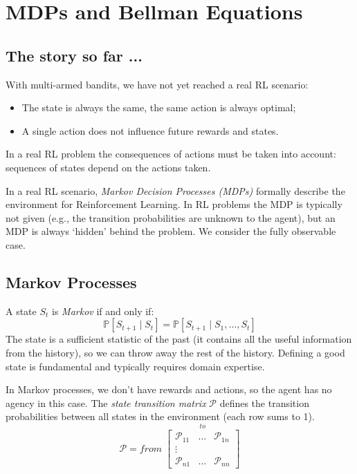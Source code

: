 \chapter{MDPs and Bellman Equations}

\section{The story so far ...}
With multi-armed bandits, we have not yet reached a real RL scenario:
\begin{itemize}
    \item The state is always the same, the same action is always optimal;
    \item A single action does not influence future rewards and states.
\end{itemize}
In a real RL problem the consequences of actions must be taken into account: sequences of states depend on the actions taken.

In a real RL scenario, \textit{Markov Decision Processes (MDPs)} formally describe the environment for Reinforcement Learning. In RL problems the MDP is typically not given (e.g., the transition probabilities are unknown to the agent), but an MDP is always `hidden' behind the problem. We consider the fully observable case.

\section{Markov Processes}
A state $S_t$ is \textit{Markov} if and only if:
\[\mathbb{P}[S_{t+1}\mid S_t]=\mathbb{P}[S_{t+1}\mid S_1,\dots,S_t]\]
The state is a sufficient statistic of the past (it contains all the useful information from the history), so we can throw away the rest of the history. Defining a good state is fundamental and typically requires domain expertise.

In Markov processes, we don't have rewards and actions, so the agent has no agency in this case. The \textit{state transition matrix} $\mathcal{P}$ defines the transition probabilities between all states in the environment (each row sums to 1).
\[
  \mathcal{P} = \textit{from}\;
  \overset{\textstyle\textit{to}}{
  \begin{bmatrix}
    \mathcal{P}_{11} & \dots & \mathcal{P}_{1n} \\
    \vdots           &       &                  \\
    \mathcal{P}_{n1} & \dots & \mathcal{P}_{nn}
  \end{bmatrix}}
\]

